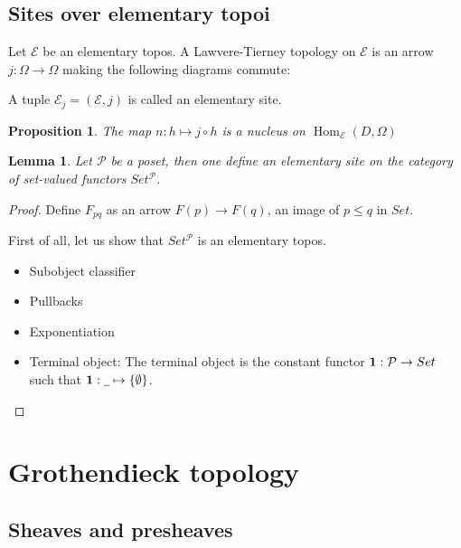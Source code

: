 \documentclass[a4paper]{article}
\theoremstyle{defin}
\theoremstyle{theorem}
\theoremstyle{claim}
\theoremstyle{prop}
\newtheorem{prop}{Proposition}
\theoremstyle{lemma}
\newtheorem{lemma}{Lemma}
\theoremstyle{fact}
\theoremstyle{ex}
\theoremstyle{col}
\begin{document}
\subsection{Sites over elementary topoi}

Let $\mathcal{E}$ be an elementary topos. A Lawvere-Tierney topology on $\mathcal{E}$ is an arrow $j : \Omega \to \Omega$ making the following diagrams commute:

\centerline{
}

A tuple $\mathcal{E}_j = (\mathcal{E}, j)$ is called an elementary site.

\begin{prop}
The map $n : h \mapsto j \circ h$ is a nucleus on $\operatorname{Hom}_\mathcal{E}(D, \Omega)$
\end{prop}

\begin{lemma}
Let $\mathcal{P}$ be a poset, then one define an elementary site on the category of set-valued functors $Set^{\mathcal{P}}$.
\end{lemma}

\begin{proof}
Define $F_{pq}$ as an arrow $F(p) \to F(q)$, an image of $p \leq q$ in $Set$.

First of all, let us show that $Set^{\mathcal{P}}$ is an elementary topos.
\begin{itemize}
\item Subobject classifier
\item Pullbacks
\item Exponentiation
\item Terminal object:
The terminal object is the constant functor ${\bf 1 } : \mathcal{P} \to Set$ such that ${\bf 1} : \underline{\:\:} \mapsto \{ \emptyset \}$.
\end{itemize}
\end{proof}

\section{Grothendieck topology}

\subsection{Sheaves and presheaves}
\end{document}
